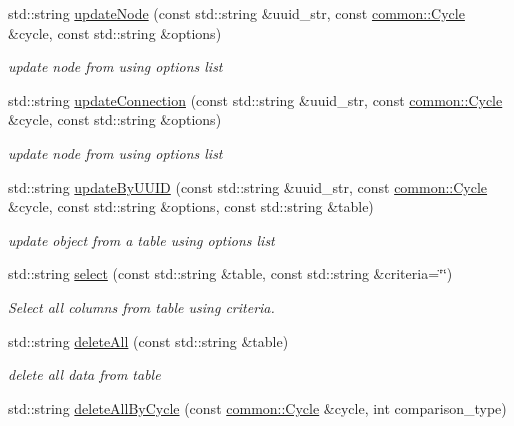 \begin{DoxyCompactItemize}
std\-::string \hyperlink{classcryomesh_1_1manager_1_1DatabaseManager_a9099aacdb6f8570c7b95364986e5e32a}{update\-Node} (const std\-::string \&uuid\-\_\-str, const \hyperlink{classcryomesh_1_1common_1_1Cycle}{common\-::\-Cycle} \&cycle, const std\-::string \&options)
\begin{DoxyCompactList}\small\item\em update node from using options list \end{DoxyCompactList}\item 
std\-::string \hyperlink{classcryomesh_1_1manager_1_1DatabaseManager_a56bcdc411b12086ca0c7e652bb47efa0}{update\-Connection} (const std\-::string \&uuid\-\_\-str, const \hyperlink{classcryomesh_1_1common_1_1Cycle}{common\-::\-Cycle} \&cycle, const std\-::string \&options)
\begin{DoxyCompactList}\small\item\em update node from using options list \end{DoxyCompactList}\item 
std\-::string \hyperlink{classcryomesh_1_1manager_1_1DatabaseManager_a591a9f332c898ed4a49f388baccdf6aa}{update\-By\-U\-U\-I\-D} (const std\-::string \&uuid\-\_\-str, const \hyperlink{classcryomesh_1_1common_1_1Cycle}{common\-::\-Cycle} \&cycle, const std\-::string \&options, const std\-::string \&table)
\begin{DoxyCompactList}\small\item\em update object from a table using options list \end{DoxyCompactList}\item 
std\-::string \hyperlink{classcryomesh_1_1manager_1_1DatabaseManager_aa706d8042942d406c73d7ab60c5c1a89}{select} (const std\-::string \&table, const std\-::string \&criteria=\char`\"{}\char`\"{})
\begin{DoxyCompactList}\small\item\em \-Select all columns from table using criteria. \end{DoxyCompactList}\item 
std\-::string \hyperlink{classcryomesh_1_1manager_1_1DatabaseManager_afbfe5f58ea22424da83657c525bbe50e}{delete\-All} (const std\-::string \&table)
\begin{DoxyCompactList}\small\item\em delete all data from table \end{DoxyCompactList}\item 
std\-::string \hyperlink{classcryomesh_1_1manager_1_1DatabaseManager_a27d2711406856ab0a3145e16117b1095}{delete\-All\-By\-Cycle} (const \hyperlink{classcryomesh_1_1common_1_1Cycle}{common\-::\-Cycle} \&cycle, int comparison\-\_\-type)

\end{DoxyCompactItemize}
